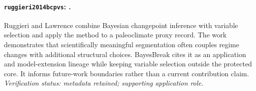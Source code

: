 
\paragraph{\texttt{ruggieri2014bcpvs}: \citet{ruggieri2014bcpvs}.}
Ruggieri and Lawrence combine Bayesian changepoint inference with variable selection and apply the method to a paleoclimate proxy record. The work demonstrates that scientifically meaningful segmentation often couples regime changes with additional structural choices. BayesBreak cites it as an application and model-extension lineage while keeping variable selection outside the protected core. It informs future-work boundaries rather than a current contribution claim. \textit{Verification status: metadata retained; supporting application role.}
